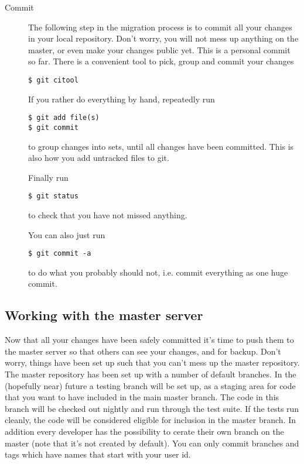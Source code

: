 \documentclass[a4paper,10pt]{article}
\begin{document}
\begin{description}
\item[Commit] The following step in the migration process is to commit all
your changes in your local repository. Don't worry, you will not mess up
anything on the master, or even make your changes public yet. This is a
personal commit so far. There is a convenient tool to pick, group and commit 
your changes
\begin{verbatim}
$ git citool
\end{verbatim}
If you rather do everything by hand, repeatedly run
\begin{verbatim}
$ git add file(s) 
$ git commit
\end{verbatim}
to group changes into sets, until all changes have been committed. 
This is also how you add untracked files to git.

Finally run 
\begin{verbatim}
$ git status
\end{verbatim}
to check that you have not missed anything. 

You can also just run
\begin{verbatim}
$ git commit -a
\end{verbatim}
to do what you probably should not, i.e. commit everything as one huge commit.
\end{description}

\subsection{Working with the master server}
Now that all your changes have been safely committed it's time to push them to
the master server so that others can see your changes, and for backup. Don't
worry, things have been set up such that you can't mess up the master
repository. 
The master repository has been set up with a number of default branches. 
In the (hopefully near) future a testing branch will be set up, as a staging area for
code that you want to have included in the main master branch. The code in
this branch will be checked out nightly and run through the test suite. If the
tests run cleanly, the code will be considered eligible for inclusion in the
master branch.
In addition every developer has the possibility to cerate their own branch on
the master (note that it's not created by default).  You can only commit
branches and tags which have names that start with your user id. 
\end{document}
